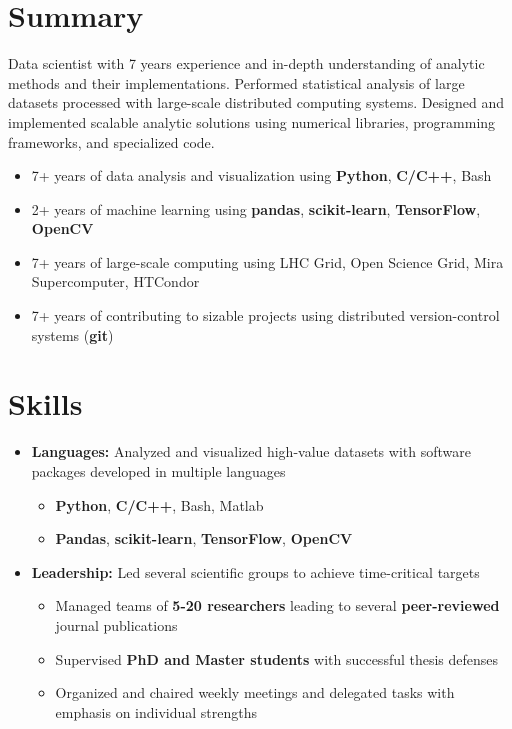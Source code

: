 \documentclass{myfancycv}
\begin{document}
\makeheader
\vspace*{-.35em}

  \vspace*{-0.5em}
\section{Summary}

Data scientist with 7 years experience and in-depth understanding of analytic methods and their implementations.
Performed statistical analysis of large datasets processed with large-scale distributed computing systems.
Designed and implemented scalable analytic solutions using numerical libraries, programming frameworks, and specialized code.
{\begin{itemize}\setlength\itemindent{-2.2em}
\item 7+ years of data analysis and visualization using {\bf Python}, {\bf C/C++}, Bash
\item 2+ years of machine learning using {\bf pandas}, {\bf scikit-learn}, {\bf TensorFlow}, {\bf OpenCV}
\item 7+ years of large-scale computing using LHC Grid, Open Science Grid, Mira Supercomputer, HTCondor
\item 7+ years of contributing to sizable projects using distributed version-control systems ({\bf git})
\end{itemize}

\section{Skills}
\begin{itemize}

\item {\textbf{Languages:} Analyzed and visualized high-value datasets with software packages developed in multiple languages
{\begin{itemize}\setlength\itemindent{-2.2em}
\item {\bf Python}, {\bf C/C++}, Bash, Matlab
\item {\bf Pandas}, {\bf scikit-learn}, {\bf TensorFlow}, {\bf OpenCV}
\end{itemize}
}
}

\vspace{6pt}

\item {\textbf{Leadership:} Led several scientific groups to achieve time-critical targets
{\begin{itemize}\setlength\itemindent{-2.2em}
    \item Managed teams of {\bf5-20 researchers} leading to several {\bf peer-reviewed} journal publications
    \item Supervised {\bf PhD and Master students} with successful thesis defenses
    \item Organized and chaired weekly meetings and delegated tasks with emphasis on individual strengths



\end{itemize}}}
\end{itemize}}
\end{document}
